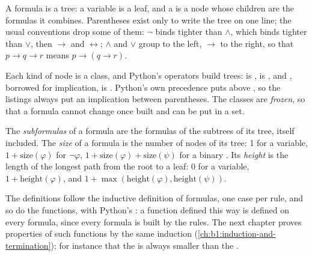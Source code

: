 A formula is a tree: a variable is a leaf, and a  is a node whose children are the formulas it combines.
Parentheses exist only to write the tree on one line; the usual conventions drop some of them: $\neg$ binds tighter
than $\wedge$, which binds tighter than $\vee$, then $\rightarrow$ and $\leftrightarrow$; $\wedge$ and $\vee$ group to
the left, $\rightarrow$ to the right, so that $p \rightarrow q \rightarrow r$ means $p \rightarrow (q \rightarrow r)$.

\label{lst:b1:propositional-logic:formula}

Each kind of node is a class, and Python's operators build trees:  is ,  is
, and , borrowed for implication, is . Python's own precedence
puts \code{>>} above \code{&}, so the listings always put an implication between parentheses. The classes are
\emph{frozen}, so that a formula cannot change once built and can be put in a set.

\begin{definition}\label{def:b1:propositional-logic:size}
The \emph{subformulas} of a formula are the formulas of the subtrees of its tree, itself included.
The \emph{size} of a formula is the number of nodes of its tree: 1 for a variable, $1 +
\text{size}(\varphi)$ for $\neg\varphi$, $1 + \text{size}(\varphi) + \text{size}(\psi)$ for a binary . Its
\emph{height} is the length of the longest path from the root to a leaf: 0 for a
variable, $1 + \text{height}(\varphi)$, and $1 + \max(\text{height}(\varphi), \text{height}(\psi))$.
\end{definition}

\label{lst:b1:propositional-logic:size}

The definitions follow the inductive definition of formulas, one case per rule, and so do the functions, with Python's
: a function defined this way is defined on every formula, since every formula is built by the rules. The
next chapter proves properties of such functions by the same induction (\cref{ch:b1:induction-and-termination}); for
instance that the  is always smaller than the .

